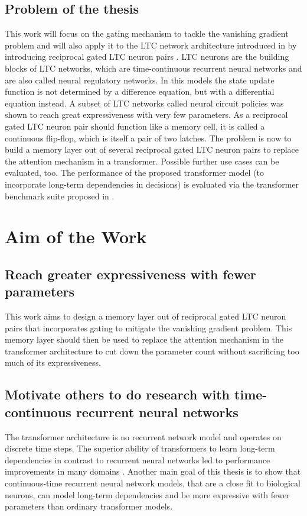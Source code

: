 \documentclass{article}
\begin{document}
    \subsection{Problem of the thesis}
    This work will focus on the gating mechanism to tackle the vanishing gradient problem and will also apply it to the LTC network architecture introduced in \cite{LTCNetworks} by introducing reciprocal gated LTC neuron pairs \cite{RCNN_ReciprocalGatedCell}.
    LTC neurons are the building blocks of LTC networks, which are time-continuous recurrent neural networks and are also called neural regulatory networks.
    In this models the state update function is not determined by a difference equation, but with a differential equation instead.
    A subset of LTC networks called neural circuit policies \cite{NCP} was shown to reach great expressiveness with very few parameters.
    As a reciprocal gated LTC neuron pair should function like a memory cell, it is called a continuous flip-flop, which is itself a pair of two latches.
    The problem is now to build a memory layer out of several reciprocal gated LTC neuron pairs to replace the attention mechanism in a transformer.
    Possible further use cases can be evaluated, too.
    The performance of the proposed transformer model (to incorporate long-term dependencies in decisions) is evaluated via the transformer benchmark suite proposed in \cite{TransformerBenchmark}.


    \section{Aim of the Work}

    \subsection{Reach greater expressiveness with fewer parameters}
    This work aims to design a memory layer out of reciprocal gated LTC neuron pairs that incorporates gating to mitigate the vanishing gradient problem.
    This memory layer should then be used to replace the attention mechanism in the transformer architecture to cut down the parameter count without sacrificing too much of its expressiveness.

    \subsection{Motivate others to do research with time-continuous recurrent neural networks}
    The transformer architecture is no recurrent network model and operates on discrete time steps.
    The superior ability of transformers to learn long-term dependencies in contrast to recurrent neural networks led to performance improvements in many domains \cite{Transformer,TransformerforRL}.
    Another main goal of this thesis is to show that continuous-time recurrent neural network models, that are a close fit to biological neurons, can model long-term dependencies and be more expressive with fewer parameters than ordinary transformer models.
\end{document}
